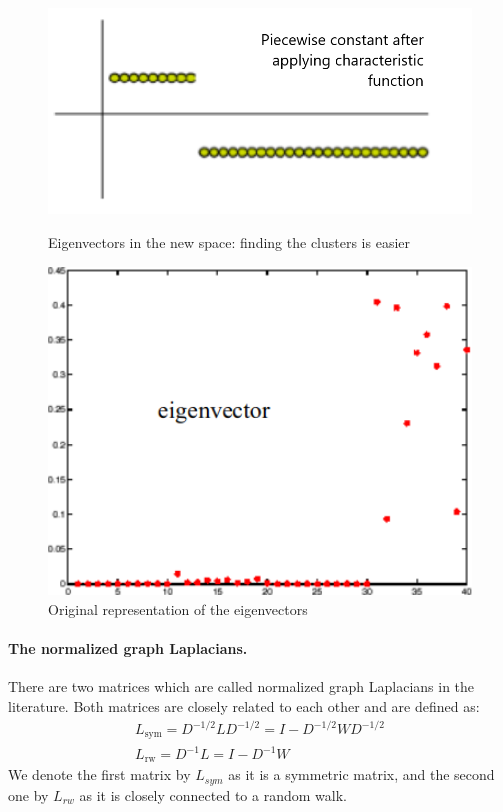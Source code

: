 \begin{figure}[H]
	\begin{minipage}[t]{0.49\linewidth} 
		\centering
		\includegraphics[width=1\textwidth]{img/idealSolutionClustering}
		\caption{Eigenvectors in the new space: finding the clusters is easier}
	\end{minipage}        
	\hspace{1cm}
	\begin{minipage}[t]{0.49\linewidth} 
		\centering
		\includegraphics[width=1\textwidth]{img/eigenvectors}
		\caption{Original representation of the eigenvectors}
	\end{minipage}
\end{figure}


\paragraph{The normalized graph Laplacians.} There are two matrices which are called normalized graph Laplacians in the literature. Both matrices are closely related to each other and are defined as:
$$\begin{array} { l } { L _ { \mathrm { sym } } = D ^ { - 1 / 2 } L D ^ { - 1 / 2 } = I - D ^ { - 1 / 2 } W D ^ { - 1 / 2 } } \\ { L _ { \mathrm { rw } } = D ^ { - 1 } L = I - D ^ { - 1 } W } \end{array}$$
We denote the first matrix by $L_{sym}$ as it is a symmetric matrix, and the second one by $L_{rw}$ as it is closely connected to a random walk.
 
